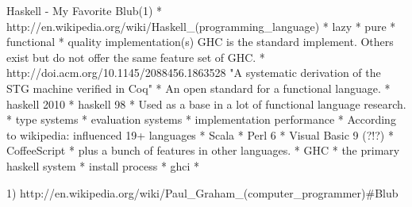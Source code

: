 \usepackage{cite}

Haskell - My Favorite Blub(1)
  * http://en.wikipedia.org/wiki/Haskell_(programming_language)
    * lazy
    * pure
    * functional
    * quality implementation(s)
      GHC is the standard implement. Others exist but do not offer the same feature set of GHC.
      * http://doi.acm.org/10.1145/2088456.1863528 "A systematic derivation of the STG machine
      verified in Coq"
  * An open standard for a functional language.
    * haskell 2010
    * haskell 98
  * Used as a base in a lot of functional language research.
    * type systems
    * evaluation systems
    * implementation performance
  * According to wikipedia: influenced 19+ languages
    * Scala
    * Perl 6
    * Visual Basic 9 (?!?)
    * CoffeeScript
    * plus a bunch of features in other languages.
  * GHC
    * the primary haskell system
  * install process
  * ghci
  * 

1) http://en.wikipedia.org/wiki/Paul_Graham_(computer_programmer)#Blub

